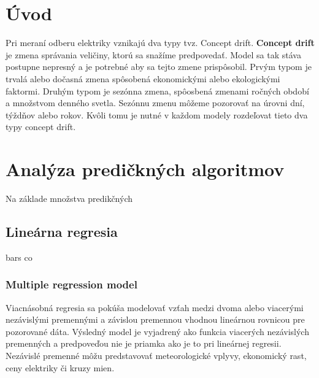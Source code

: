 \documentclass[12pt,oneside,slovak,a4paper]{book}
\begin{document}

\chapter*{Úvod}

Pri meraní odberu elektriky vznikajú dva typy tvz. Concept drift.
\textbf{Concept drift} je zmena správania veličiny, ktorú sa snažíme
predpovedať. Model sa tak stáva postupne nepresný a je potrebné aby sa tejto
zmene prispôsobil. Prvým typom je trvalá alebo dočasná zmena spôsobená
ekonomickými alebo ekologickými faktormi. Druhým typom je sezónna zmena,
spôosbená zmenami ročných období a množstvom denného svetla. Sezónnu zmenu
môžeme pozorovať na úrovni dní, týždňov alebo rokov. Kvôli tomu je nutné
v každom modely rozdeľovat tieto dva typy concept drift\cite{Grmanova2016}.


\chapter{Analýza predičkných algoritmov}
Na základe množstva predikčných
\section{Lineárna regresia}
bars co

\subsection{Multiple regression model}
Viacnásobná regresia sa pokúša modelovať vzťah medzi dvoma alebo viacerými
nezávislými premennými a závislou premennou vhodnou lineárnou rovnicou pre
pozorované dáta. Výsledný model je vyjadrený ako funkcia viacerých nezávislých
premenných a predpoveďou nie je priamka ako je to pri lineárnej
regresii\cite{Grmanova2016}.
Nezávislé premenné môžu predstavovať meteorologické vplyvy, ekonomický rast,
ceny elektriky či kruzy mien\cite{KumarSingh2013}.
\end{document}
